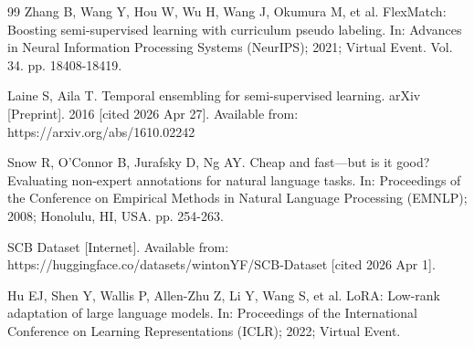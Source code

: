 \documentclass{ieeeaccess}
\begin{document}
\begin{thebibliography}{99}
Zhang B, Wang Y, Hou W, Wu H, Wang J, Okumura M, et al.
FlexMatch: Boosting semi-supervised learning with curriculum pseudo
labeling.
In: Advances in Neural Information Processing Systems (NeurIPS);
2021; Virtual Event. Vol. 34. pp. 18408-18419.

Laine S, Aila T.
Temporal ensembling for semi-supervised learning.
arXiv [Preprint]. 2016 [cited 2026 Apr 27]. Available from:
https://arxiv.org/abs/1610.02242

Snow R, O'Connor B, Jurafsky D, Ng AY.
Cheap and fast---but is it good? Evaluating non-expert annotations
for natural language tasks.
In: Proceedings of the Conference on Empirical Methods in Natural
Language Processing (EMNLP); 2008; Honolulu, HI, USA. pp. 254-263.

SCB Dataset [Internet]. Available from:
https://huggingface.co/datasets/wintonYF/SCB-Dataset [cited 2026 Apr 1].

Hu EJ, Shen Y, Wallis P, Allen-Zhu Z, Li Y, Wang S, et al.
LoRA: Low-rank adaptation of large language models.
In: Proceedings of the International Conference on Learning
Representations (ICLR); 2022; Virtual Event.

\end{thebibliography}

\EOD
\end{document}
